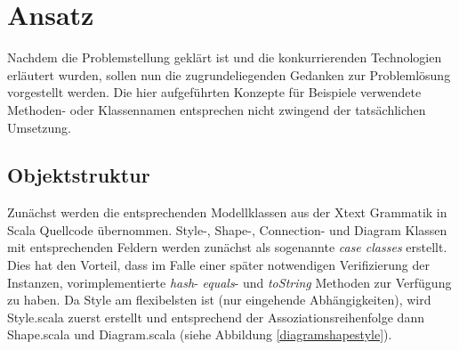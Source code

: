 \chapter{Ansatz}\label{ansatz}
Nachdem die Problemstellung geklärt ist und die konkurrierenden Technologien erläutert wurden, sollen nun die zugrundeliegenden Gedanken zur Problemlösung vorgestellt werden. Die hier aufgeführten Konzepte für Beispiele verwendete Methoden- oder Klassennamen entsprechen nicht zwingend der tatsächlichen Umsetzung.
\section{Objektstruktur}
Zunächst werden die entsprechenden Modellklassen aus der Xtext Grammatik in Scala Quellcode übernommen. Style-, Shape-, Connection- und Diagram Klassen mit entsprechenden Feldern werden zunächst als sogenannte \textit{case classes} erstellt. Dies hat den Vorteil, dass im Falle einer später notwendigen Verifizierung der Instanzen, vorimplementierte \textit{hash}- \textit{equals}- und \textit{toString} Methoden zur Verfügung zu haben. Da Style am flexibelsten ist (nur eingehende Abhängigkeiten), wird Style.scala zuerst erstellt und entsprechend der Assoziationsreihenfolge dann Shape.scala und Diagram.scala (siehe Abbildung \ref{diagramshapestyle}).
